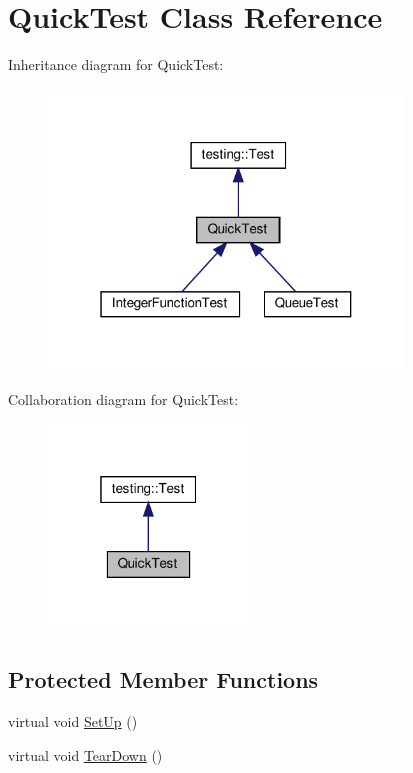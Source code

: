 \hypertarget{class_quick_test}{}\section{Quick\+Test Class Reference}
\label{class_quick_test}


Inheritance diagram for Quick\+Test\+:
\nopagebreak
\begin{figure}[H]
\begin{center}
\leavevmode
\includegraphics[width=268pt]{class_quick_test__inherit__graph}
\end{center}
\end{figure}


Collaboration diagram for Quick\+Test\+:
\nopagebreak
\begin{figure}[H]
\begin{center}
\leavevmode
\includegraphics[width=151pt]{class_quick_test__coll__graph}
\end{center}
\end{figure}
\subsection*{Protected Member Functions}
\begin{DoxyCompactItemize}
\item 
virtual void \hyperlink{class_quick_test_ae52ad082887512b92240ce40a1a05650}{Set\+Up} ()
\item 
virtual void \hyperlink{class_quick_test_a6b2d16cc0c69d30a16fe612db5abfc39}{Tear\+Down} ()
\end{DoxyCompactItemize}
